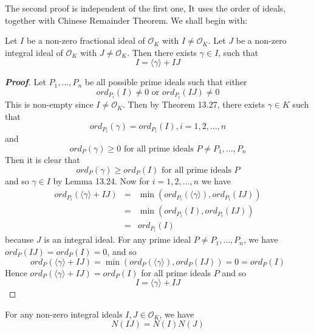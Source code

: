 The second proof is independent of the first one, It uses the order of ideals, together with Chinese Remainder Theorem.
We shall begin with:
\begin{lemma} Let $I$ be a non-zero fractional ideal of $\mathcal{O}_K$ with $I \neq \mathcal{O}_K$. Let $J$ be a non-zero integral ideal of $\mathcal{O}_K$ with $J \neq \mathcal{O}_K$. Then there exists $\gamma \in I$, such that
$$I=\langle \gamma \rangle +IJ$$
\end{lemma}
\begin{proof}[\bf Proof] Let $P_1,\ldots,P_n$ be all possible prime ideals such that either
$$ord_{P_i}(I) \neq 0 \text{ or } ord_{P_i}(IJ) \neq 0$$
This is non-empty since $I \neq \mathcal{O}_K$. Then by Theorem 13.27, there exists $\gamma \in K$ such that
$$ord_{P_i}(\gamma)=ord_{P_i}(I), i=1,2,\ldots,n$$
and
$$ord_P(\gamma) \ge 0 \text{ for all prime ideals } P \neq P_1,\ldots,P_n$$
Then it is clear that
$$ord_P(\gamma) \ge ord_P(I) \text{ for all prime ideals } P$$
and so $\gamma \in I$ by Lemma 13.24.
Now for $i=1,2,\ldots,n$ we have
\begin{eqnarray*}
ord_{P_i}(\langle \gamma \rangle +IJ)&=&\min{(ord_{P_i}(\langle \gamma \rangle),ord_{P_i}(IJ))}\\
&=&\min{(ord_{P_i}(I),ord_{P_i}(IJ))}\\
&=&ord_{P_i}(I)
\end{eqnarray*}
because $J$ is an integral ideal. For any prime ideal $P \neq P_1,\ldots,P_n$, we have $ord_P(IJ)=ord_P(I)=0$, and so
$$ord_P(\langle \gamma \rangle+IJ)=\min{(ord_P(\langle \gamma \rangle),ord_P(IJ))}=0=ord_P(I)$$
Hence $ord_P(\langle \gamma \rangle +IJ)=ord_P(I)$ for all prime ideals $P$ and so
$$I=\langle \gamma \rangle +IJ$$
\end{proof}
\begin{theorem} For any non-zero integral ideals $I,J \in \mathcal{O}_K$, we have
$$N(IJ)=N(I)N(J)$$
\end{theorem}

